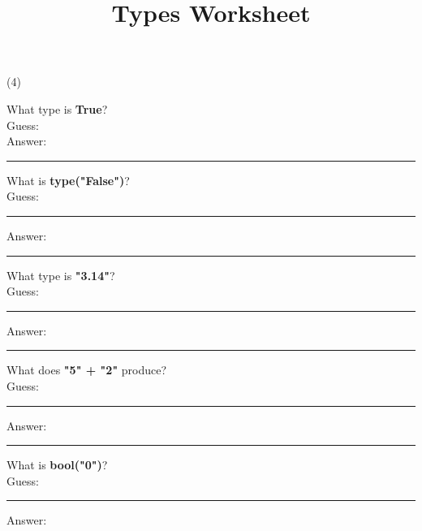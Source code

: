 \documentclass{article}
\title{\vspace{-3em}Types Worksheet\vspace{-2em}}
\begin{document}
\maketitle

\begin{tasks}[
    style=enumerate,
    label-format=\bfseries,
    label-width=1.5em,
    item-indent=2em,
    column-sep=1em,
    after-item-skip=2em
  ](4)
    \raggedright
        \task \noindent What type is \textbf{True}? \\
        Guess:  \vspace{3mm}\\
        Answer:  \vspace{3mm}\\
        \rule{\linewidth}{0.4pt} %

        \task \noindent What is \textbf{type("False")}?  \\
        Guess:  \vspace{3mm}\\
        \rule{\linewidth}{0.4pt} %
        Answer:  \vspace{3mm}\\
        \rule{\linewidth}{0.4pt} %

        \task What type is \textbf{"3.14"}?  \\
        Guess:  \vspace{3mm}\\
        \rule{\linewidth}{0.4pt} %
        Answer:  \vspace{3mm}\\

        \rule{\linewidth}{0.4pt} %

        \task What does \textbf{"5" + "2"} produce?  \\
        Guess:  \vspace{3mm}\\
        \rule{\linewidth}{0.4pt} %
        Answer:  \vspace{3mm}\\

        \rule{\linewidth}{0.4pt} %

        \task What is \textbf{bool("0")}?  \\
        Guess:  \vspace{3mm}\\
        \rule{\linewidth}{0.4pt} %
        Answer:  \vspace{3mm}\\


\end{tasks}
\end{document}
